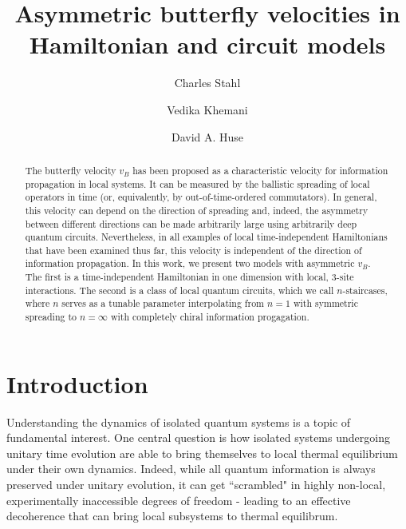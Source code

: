 \documentclass[aps,prx,reprint,superscriptaddress, longbibliography]{revtex4-1}
\begin{document}
\title{Asymmetric butterfly velocities in Hamiltonian and circuit models}
%
\author{Charles Stahl}
\author{Vedika Khemani}
\author{David A. Huse}

\begin{abstract}
	The butterfly velocity $v_B$ has been proposed as a characteristic velocity for information propagation in local systems. It can be measured by the ballistic spreading of local operators in time (or, equivalently, by out-of-time-ordered commutators). In general, this velocity can depend on the direction of spreading and, indeed, the asymmetry between different directions can be made arbitrarily large using arbitrarily deep quantum circuits. Nevertheless, in all examples of local time-independent Hamiltonians that have been examined thus far, this velocity is independent of the direction of information propagation. In this work, we present two models with asymmetric $v_B$. The first is a time-independent Hamiltonian in one dimension with local, 3-site interactions. The second is a class of local quantum circuits, which we call $n$-staircases, where $n$ serves as a tunable parameter interpolating from $n=1$ with symmetric spreading to $n=\infty$ with completely chiral information progagation.  
\end{abstract}

\maketitle

\section{Introduction}
Understanding the dynamics of isolated quantum systems is a topic of fundamental interest. One central question is how isolated systems undergoing unitary time evolution are able to bring themselves to local thermal equilibrium under their own dynamics. Indeed, while all quantum information is always preserved under unitary evolution, it can get ``scrambled" in highly non-local, experimentally inaccessible degrees of freedom - leading to an effective decoherence that can bring local subsystems to thermal equilibrum. 
\end{document}
